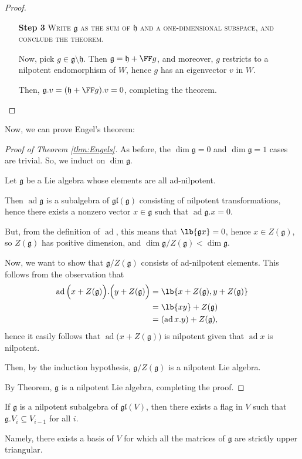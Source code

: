 \documentclass{article}
\DeclarePairedDelimiter\lb\lbrack\rbrack
\newcommand*\ad{\operatorname{ad}}
\newcommand*\frkg{{\ensuremath{\mathfrak{g}}}}
\newcommand*\frkh{{\ensuremath{\mathfrak{h}}}}
\newcommand*\gl{\ensuremath{\mathfrak{gl}}}
\newcommand*\acts{.}
\begin{document}
\begin{proof}
\begin{itemize}
        \item[\textbf{Step 3}] 
            \textsc{\color{Crimson} Write $\frkg$ as the sum of $\frkh$ and a one-dimensional subspace, and conclude the theorem.}

            Now, pick $g \in \frkg \setminus \frkh$.
            Then $\frkg = \frkh + \FF g$, and moreover, $g$ restricts to a nilpotent endomorphism of $W$, hence $g$ has an eigenvector $v$ in $W$.

            Then, $\frkg.v = (\frkh + \FF g) \acts v = 0$, completing the theorem.
        \end{itemize}
\end{proof}

Now, we can prove Engel's theorem:

\begin{proof}
    [Proof of Theorem \ref{thm:Engels}]
    As before, the $\dim \frkg = 0$ and $\dim \frkg = 1$ cases are trivial.
    So, we induct on $\dim \frkg$.

    Let $\frkg$ be a Lie algebra whose elements are all ad-nilpotent.

    Then $\ad \frkg$ is a subalgebra of $\gl(\frkg)$ consisting of nilpotent transformations, hence there exists a nonzero vector $x \in \frkg$ such that $\ad \frkg \acts x = 0$.

    But, from the definition of $\ad$, this means that $\lb{\frkg x} = 0$, hence $x \in Z(\frkg)$, so $Z(\frkg)$ has positive dimension, and $\dim \frkg / Z(\frkg) < \dim \frkg$.

    Now, we want to show that $\frkg/Z(\frkg)$ consists of ad-nilpotent elements.
    This follows from the observation that
    \begin{align*}
        \ad \Big(x + Z(\frkg)\Big) \acts \Big(y + Z(\frkg)\Big)
        &= 
        \lb{x + Z(\frkg), y + Z(\frkg)} 
        \\
        &= \lb{xy} + Z(\frkg) 
        \\
        &= (\ad x \acts y) + Z(\frkg),
    \end{align*}
    hence it easily follows that $\ad \Big(x + Z(\frkg)\Big)$ is nilpotent given that $\ad x$ is nilpotent.
    
    Then, by the induction hypothesis, $\frkg/Z(\frkg)$ is a nilpotent Lie algebra.

    By Theorem, $\frkg$ is a nilpotent Lie algebra, completing the proof.
\end{proof}

\begin{corollary}
    \label{corr:EngelsFlag}
    If $\frkg$ is a nilpotent subalgebra of $\gl(V)$, then there exists a flag in $V$ such that $\frkg \acts V_i \subseteq V_{i-1}$ for all $i$.

    Namely, there exists a basis of $V$ for which all the matrices of $\frkg$ are strictly upper triangular.
\end{corollary}
\end{document}
